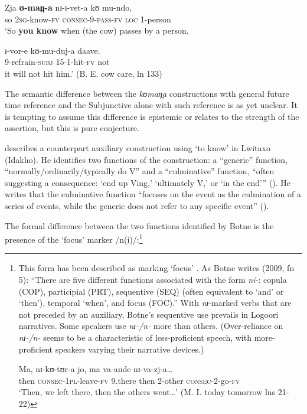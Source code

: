 \documentclass[output=paper]{langsci/langscibook}
\begin{document}
\ea\label{ex:sarvasy:25}
\gll Zja   \textbf{ʊ-man̪-a}     nɪ-ɪ-vet-a     kʊ     mu-ndo, \\
so  2\textsc{sg-}know\textsc{-fv}  \textsc{consec}-9-\textsc{pass}-\textsc{fv}   \textsc{loc}  1-person \\
\glt ‘So \textbf{you know} when (the cow) passes by a person,

\gll ɪ-vor-e     kʊ-mu-duj-a   daave. \\
9-refrain-\textsc{subj}  15-1-hit-\textsc{fv}  not \\
\glt it will not hit him.’ (B. E. cow care, ln 133)
\z

The semantic difference between the \textit{kʊman̪a} constructions with general future time reference and the Subjunctive alone with such reference is as yet unclear. It is tempting to assume this difference is epistemic or relates to the strength of the assertion, but this is pure conjecture.

\citet{Botne2009} describes a counterpart auxiliary construction using ‘to know’ in Lwitaxo (Idakho). He identifies two functions of the construction: a “generic” function, “normally/ordinarily/typically do V” and a “culminative” function, “often suggesting a consequence: ‘end up Ving,’ ‘ultimately V,’ or ‘in the end’” (\citeyear[93]{Botne2009}). He writes that the culminative function “focuses on the event as the culmination of a series of events, while the generic does not refer to any specific event” (\citeyear[95]{Botne2009}).

The formal difference between the two functions identified by Botne is the presence of the ‘focus’ marker /n(i)/:\footnote{This form has been described as marking ‘focus’ \citep{Dalgish1979,Nurse2006,Botne2009}. As Botne writes (2009, fn 5): “There are five different functions associated with the form \textit{ni-}: copula (COP), participial (PRT), sequentive (SEQ) (often equivalent to ‘and’ or ‘then’), temporal ‘when’, and focus (FOC).” With \textit{nɪ}-marked verbs that are not preceded by an auxiliary, Botne’s sequentive use prevails in Logoori narratives. Some speakers use \textit{nɪ-/n-} more than others. (Over-reliance on \textit{nɪ-/n-} seems to be a characteristic of less-proficient speech, with more-proficient speakers varying their narrative devices.)  

\gll Ma,   nɪ-kʊ-tʊr-a     jo,  ma   va-ande     nɪ-va-zj-a…  \\
then  \textsc{consec}-\textsc{1pl-}leave-\textsc{fv}  9.there  then  2-other    \textsc{consec}-2-go-\textsc{fv}\\

‘Then, we left there, then the others went…’ (M. I. today tomorrow lns 21-22)}
\end{document}
